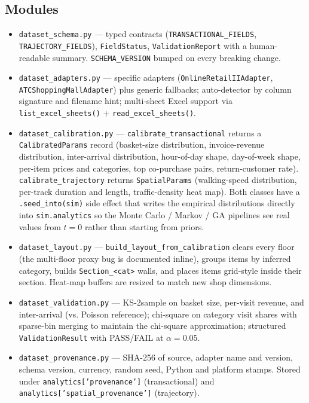 \documentclass[11pt]{article}
\begin{document}
\subsection{Modules}
\begin{itemize}[leftmargin=*]
  \item \texttt{dataset\_schema.py} --- typed contracts
    (\texttt{TRANSACTIONAL\_FIELDS},
    \texttt{TRAJECTORY\_FIELDS}), \texttt{FieldStatus},
    \texttt{ValidationReport} with a human-readable summary.
    \texttt{SCHEMA\_VERSION} bumped on every breaking change.
  \item \texttt{dataset\_adapters.py} --- specific adapters
    (\texttt{OnlineRetailIIAdapter}, \texttt{ATCShoppingMallAdapter})
    plus generic fallbacks; auto-detector by column signature and
    filename hint; multi-sheet Excel support via
    \texttt{list\_excel\_sheets()} + \texttt{read\_excel\_sheets()}.
  \item \texttt{dataset\_calibration.py} ---
    \texttt{calibrate\_transactional} returns a
    \texttt{CalibratedParams} record (basket-size distribution,
    invoice-revenue distribution, inter-arrival distribution,
    hour-of-day shape, day-of-week shape, per-item prices and
    categories, top co-purchase pairs, return-customer rate).
    \texttt{calibrate\_trajectory} returns
    \texttt{SpatialParams} (walking-speed distribution, per-track
    duration and length, traffic-density heat map). Both classes
    have a \texttt{.seed\_into(sim)} side effect that writes the
    empirical distributions directly into \texttt{sim.analytics}
    so the Monte Carlo / Markov / GA pipelines see real values
    from $t=0$ rather than starting from priors.
  \item \texttt{dataset\_layout.py} ---
    \texttt{build\_layout\_from\_calibration} clears every floor
    (the multi-floor proxy bug is documented inline), groups items
    by inferred category, builds \texttt{Section\_<cat>} walls, and
    places items grid-style inside their section. Heat-map buffers
    are resized to match new shop dimensions.
  \item \texttt{dataset\_validation.py} --- KS-2sample on basket
    size, per-visit revenue, and inter-arrival (vs. Poisson
    reference); chi-square on category visit shares with
    sparse-bin merging to maintain the chi-square approximation;
    structured \texttt{ValidationResult} with PASS/FAIL at
    $\alpha=0.05$.
  \item \texttt{dataset\_provenance.py} --- SHA-256 of source,
    adapter name and version, schema version, currency, random
    seed, Python and platform stamps. Stored under
    \texttt{analytics['provenance']} (transactional) and
    \texttt{analytics['spatial\_provenance']} (trajectory).
\end{itemize}
\end{document}
